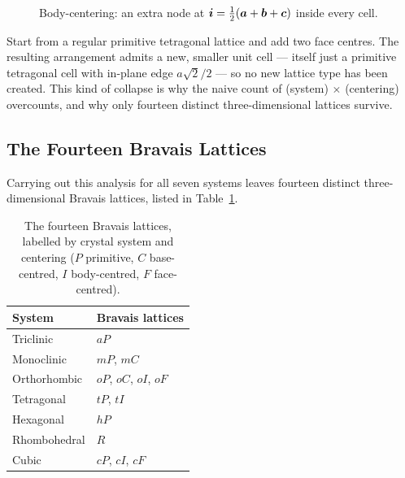 \begin{figure}[ht]
\centering
{}
\caption{Body-centering: an extra node at $\bm{i} = \tfrac12(\bm{a}+\bm{b}+\bm{c})$ inside every cell.}
\label{fig:xrd-bcc}
\end{figure}

\begin{example}
Start from a regular primitive tetragonal lattice and add two face centres. The resulting arrangement admits a new, smaller unit cell --- itself just a primitive tetragonal cell with in-plane edge $a\sqrt{2}/2$ --- so no new lattice type has been created. This kind of collapse is why the naive count of (system) $\times$ (centering) overcounts, and why only fourteen distinct three-dimensional lattices survive.
\end{example}

\subsection{The Fourteen Bravais Lattices}

Carrying out this analysis for all seven systems leaves fourteen distinct three-dimensional Bravais lattices, listed in Table~\ref{tab:xrd-bravais}.

\begin{table}[ht]
\centering
\begin{tabular}{@{}ll@{}}
\toprule
System & Bravais lattices \\
\midrule
Triclinic & $aP$ \\
Monoclinic & $mP$, $mC$ \\
Orthorhombic & $oP$, $oC$, $oI$, $oF$ \\
Tetragonal & $tP$, $tI$ \\
Hexagonal & $hP$ \\
Rhombohedral & $R$ \\
Cubic & $cP$, $cI$, $cF$ \\
\bottomrule
\end{tabular}
\caption{The fourteen Bravais lattices, labelled by crystal system and centering ($P$ primitive, $C$ base-centred, $I$ body-centred, $F$ face-centred).}
\label{tab:xrd-bravais}
\end{table}

